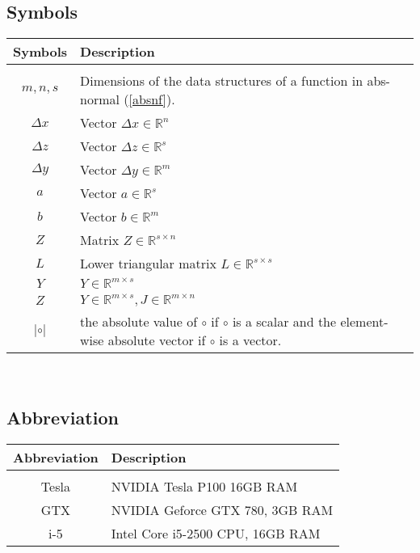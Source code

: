 \subsection{Symbols}
\begin{tabular}{c|l}
	Symbols & Description \\
	\hline \\
	 $m,n,s$ & Dimensions of the data structures of a function in abs-normal (\ref{absnf}). \\
	 $\Delta x$ & Vector $\Delta x \in \mathbb{R}^n$ \\
	 $\Delta z$ & Vector $\Delta z \in \mathbb{R}^s$ \\
	 $\Delta y$ & Vector $\Delta y \in \mathbb{R}^m$ \\
	 $a$		& Vector $a \in \mathbb{R}^s$ \\
	 $b$		& Vector $b \in \mathbb{R}^{m}$ \\
	 $Z$		& Matrix $Z \in \mathbb{R}^{s\times n}$ \\
	 $L$	    & Lower triangular matrix $L \in \mathbb{R}^{s \times s}$ \\
	 $Y$		& $Y \in \mathbb{R}^{m \times s}$ \\
	 $Z$		& $Y \in \mathbb{R}^{m \times s}, J \in \mathbb{R}^{m \times n}$ \\
	 $|\circ|$  & the absolute value of $\circ$ if $\circ$ is a scalar and the element-wise absolute vector if $\circ$ is a vector.
\end{tabular} \\

\subsection{Abbreviation}
\begin{tabular}{c|l}
	Abbreviation & Description \\
	\hline \\
	Tesla & NVIDIA Tesla P100 16GB RAM \\
	GTX & NVIDIA Geforce GTX 780, 3GB RAM \\
	i-5 & Intel Core i5-2500 CPU, 16GB RAM \\
\end{tabular}